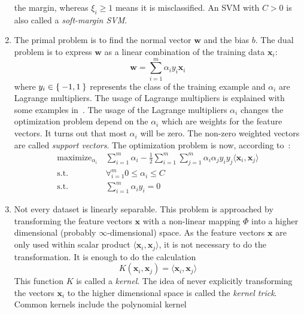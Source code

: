 \documentclass[technote,a4paper,leqno]{IEEEtran}
\DeclareMathOperator*{\maximize}{maximize}
\begin{document}
\begin{enumerate}
          the margin, whereas \(\xi_i \ge 1\) means it is misclassified. An
          \gls{SVM} with $C > 0$ is also called a \textit{soft-margin \gls{SVM}}.
    \item The primal problem is to find the normal vector $\mathbf{w}$ and the
          bias $b$. The dual problem is to express $\mathbf{w}$ as a linear
          combination of the training data $\mathbf{x}_i$:
          \[\mathbf{w} = \sum_{i=1}^m \alpha_i y_i \mathbf{x}_i\]
          where $y_i \in \Set{-1, 1}$ represents the class of the training
          example and $\alpha_i$ are Lagrange multipliers. The usage of
          Lagrange multipliers is explained with some examples
          in~\cite{smithlagrange}. The usage of the Lagrange multipliers
          $\alpha_i$ changes the optimization problem depend on the
          $\alpha_i$ which are weights for the feature vectors. It turns
          out that most $\alpha_i$ will be zero. The non-zero weighted vectors
          are called \textit{support vectors}.
          The optimization problem is now, according to~\cite{burges1998tutorial}:
          \begin{equation*}
          \begin{aligned}
              \maximize_{\alpha_i}\,& \sum_{i=1}^m \alpha_i - \frac{1}{2} \sum_{i=1}^m \sum_{j=1}^m \alpha_i \alpha_j y_i y_j \langle \mathbf{x}_i, \mathbf{x}_j \rangle\\
              \text{s.t. } & \forall_{i=1}^m 0 \leq \alpha_i \leq C\\
              \text{s.t. } & \sum_{i=1}^m \alpha_i y_i = 0
          \end{aligned}
          \end{equation*}
    \item Not every dataset is linearly separable. This problem is approached
          by transforming the feature vectors $\mathbf{x}$ with a non-linear
          mapping $\Phi$ into a higher dimensional (probably
          $\infty$-dimensional) space. As the feature vectors $\mathbf{x}$
          are only used within scalar product
          $\langle \mathbf{x}_i, \mathbf{x}_j \rangle$, it is not necessary to
          do the transformation. It is enough to do the calculation
          \[K(\mathbf{x}_i, \mathbf{x}_j) = \langle \mathbf{x}_i, \mathbf{x}_j \rangle\]
          This function $K$ is called a \textit{kernel}. The idea of never
          explicitly transforming the vectors $\mathbf{x}_i$ to the higher
          dimensional space is called the \textit{kernel trick}. Common kernels
          include the polynomial kernel

\end{enumerate}
\end{document}
